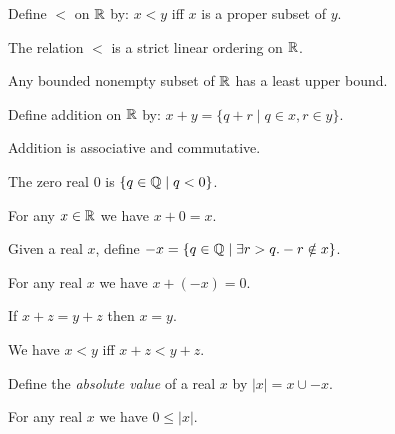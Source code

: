 \begin{definition}
    Define $<$ on $\mathbb{R}$ by: $x < y$ iff $x$ is a proper subset of $y$.
\end{definition}

\begin{theorem}
    The relation $<$ is a strict linear ordering on $\mathbb{R}$.
\end{theorem}

\begin{theorem}
    Any bounded nonempty subset of $\mathbb{R}$ has a least upper bound.
\end{theorem}

\begin{definition}
    Define addition on $\mathbb{R}$ by: $x + y = \{ q + r \mid q \in x, r \in y \}$.
\end{definition}

\begin{theorem}
    Addition is associative and commutative.
\end{theorem}

\begin{definition}
    The zero real $0$ is $\{ q \in \mathbb{Q} \mid q < 0 \}$.
\end{definition}

\begin{theorem}
    For any $x \in \mathbb{R}$ we have $x + 0 = x$.
\end{theorem}

\begin{definition}
    Given a real $x$, define $-x = \{ q \in \mathbb{Q} \mid \exists r > q. -r \notin x \}$.
\end{definition}

\begin{theorem}
    For any real $x$ we have $x + (-x) = 0$.
\end{theorem}

\begin{corollary}
    If $x + z = y + z$ then $x = y$.
\end{corollary}

\begin{theorem}
    We have $x < y$ iff $x + z < y + z$.
\end{theorem}

\begin{definition}
    Define the \emph{absolute value} of a real $x$ by $|x| = x \cup -x$.
\end{definition}

\begin{theorem}
    For any real $x$ we have $0 \leq |x|$.
\end{theorem}

